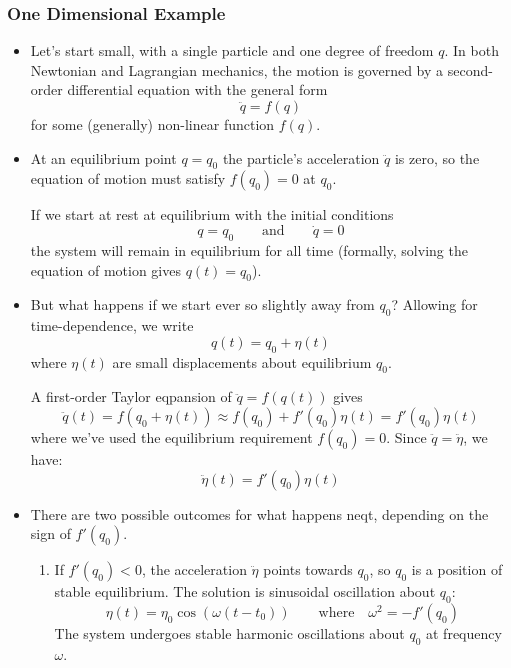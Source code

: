 \documentclass[11pt, a4paper]{article}
\newcommand{\eqtext}[1]{\qquad \text{#1} \qquad}
\begin{document}
\subsubsection{One Dimensional Example}
\begin{itemize}

	\item Let's start small, with a single particle and one degree of freedom $ q $. In both Newtonian and Lagrangian mechanics, the motion is governed by a second-order differential equation with the general form
	\begin{equation*}
		\ddot{q} = f(q)
	\end{equation*}
	for some (generally) non-linear function $ f(q) $.
	
	\item At an equilibrium point $ q = q_{0} $ the particle's acceleration $ \ddot{q} $ is zero, so the equation of motion must satisfy $ f(q_{0}) = 0$ at $ q_{0} $. 
	
	If we start at rest at equilibrium with the initial conditions 
	\begin{equation*}
		q = q_{0} \eqtext{and} \dot{q} = 0
	\end{equation*}
	the system will remain in equilibrium for all time (formally, solving the equation of motion gives $ q(t) = q_{0} $).
	
	\item But what happens if we start ever so slightly away from $ q_{0} $? Allowing for time-dependence, we write
	\begin{equation*}
		q(t) = q_0 + \eta(t)
	\end{equation*}
	where $ \eta(t) $ are small displacements about equilibrium $ q_{0} $. 
	
	A first-order Taylor eqpansion of $ \ddot{q} = f(q(t)) $ gives 
	\begin{equation*}
		 \ddot{q}(t) = f( q_0 + \eta(t)) \approx f(q_{0}) + f'(q_0) \eta(t) = f'(q_{0})\eta(t)
	\end{equation*}
	where we've used the equilibrium requirement $  f(q_{0}) = 0 $. Since $ \ddot{q} = \ddot{\eta} $, we have:
	\begin{equation*}
		\ddot{\eta} (t) = f'(q_{0})\eta(t)
	\end{equation*}
	
	\item There are two possible outcomes for what happens neqt, depending on the sign of $ f'(q_{0}) $.
	\begin{enumerate}
		\item If $ f'(q_0) < 0$, the acceleration $ \ddot{\eta} $ points towards $ q_0 $, so $ q_0 $ is a position of stable equilibrium. The solution is sinusoidal oscillation about $ q_0 $:
		\begin{equation*}
			 \eta(t) = \eta_0 \cos (\omega (t - t_0) ) \qquad \text{where} \quad \omega^2 = - f'(q_0)
		\end{equation*}
		The system undergoes stable harmonic oscillations about $ q_{0} $ at frequency $ \omega $.
		

\end{enumerate}
\end{itemize}
\end{document}
